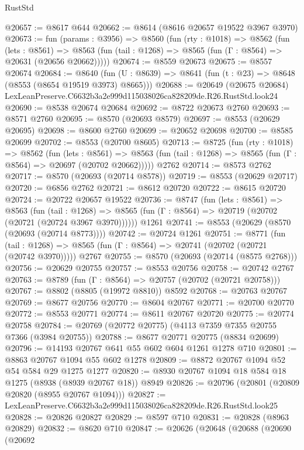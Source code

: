 \begin{lexlean}{RustStd}
\begin{coremodule}
@20657 := @8617 @644
@20662 := @8614 (@8616 @20657 @19522 @3967 @3970)
@20673 := fun (params : @3956) =>
  @8560
    (fun (rty : @1018) =>
    @8562
      (fun (lets : @8561) =>
      @8563 (fun (tail : @1268) => @8565 (fun (Γ : @8564) => @20631 (@20656 @20662)))))
@20674 := @8559 @20673
@20675 := @8557 @20674
@20684 := @8640
    (fun (U : @8639) => @8641 (fun (t : @23) => @8648 (@8553 (@8654 @19519 @3973) @8665)))
@20688 := @20649
    (@20675 @20684)
    LexLeanPreserve.C6632b3a2e999d115038026ca828209de.R26.RustStd.look24
@20690 := @8538 @20674 @20684
@20692 := @8722 @20673 @2760
@20693 := @8571 @2760
@20695 := @8570 (@20693 @8579)
@20697 := @8553 (@20629 @20695)
@20698 := @8600 @2760
@20699 := @20652 @20698
@20700 := @8585 @20699
@20702 := @8553 (@20700 @8605)
@20713 := @8725
    (fun (rty : @1018) =>
    @8562
      (fun (lets : @8561) =>
      @8563 (fun (tail : @1268) => @8565 (fun (Γ : @8564) => @20697 (@20702 @20662)))))
    @2762
@20714 := @8573 @2762
@20717 := @8570 (@20693 (@20714 @8578))
@20719 := @8553 (@20629 @20717)
@20720 := @6856 @2762
@20721 := @8612 @20720
@20722 := @8615 @20720
@20724 := @20722 @20657 @19522
@20736 := @8747
    (fun (lets : @8561) =>
    @8563
      (fun (tail : @1268) =>
      @8565 (fun (Γ : @8564) => @20719 (@20702 (@20721 (@20724 @3967 @3970))))))
    @1261
@20741 := @8553 (@20629 (@8570 (@20693 (@20714 @8773))))
@20742 := @20724 @1261
@20751 := @8771
    (fun (tail : @1268) => @8565 (fun (Γ : @8564) => @20741 (@20702 (@20721 (@20742 @3970)))))
    @2767
@20755 := @8570 (@20693 (@20714 (@8575 @2768)))
@20756 := @20629 @20755
@20757 := @8553 @20756
@20758 := @20742 @2767
@20763 := @8789 (fun (Γ : @8564) => @20757 (@20702 (@20721 @20758)))
@20767 := @8802 (@8805 (@19972 @8810)) @8592
@20768 := @20763 @20767
@20769 := @8677 @20756
@20770 := @8604 @20767
@20771 := @20700 @20770
@20772 := @8553 @20771
@20774 := @8611 @20767 @20720
@20775 := @20774 @20758
@20784 := @20769 (@20772 @20775) (@4113 @7359 @7355 @20755 @7366 (@3984 @20755))
@20788 := @8677 @20771 @20775 (@8834 @20699)
@20796 := @14193 @20767 @641 @55 @602 @604 @1261 @1278 @710
@20801 := @8863 @20767 @1094 @55 @602 @1278
@20809 := @8872 @20767 @1094 @52 @54 @584 @29 @1275 @1277
@20820 := @8930 @20767 @1094 @18 @584 @18 @1275 (@8938 (@8939 @20767 @18)) @8949
@20826 := @20796 (@20801 (@20809 @20820 (@8955 @20767 @1094)))
@20827 := LexLeanPreserve.C6632b3a2e999d115038026ca828209de.R26.RustStd.look25
@20828 := @20826 @20827
@20829 := @8597 @710
@20831 := @20828 (@8963 @20829)
@20832 := @8620 @710
@20847 := @20626
    (@20648
      (@20688
        (@20690
          (@20692

\end{coremodule}
\end{lexlean}
